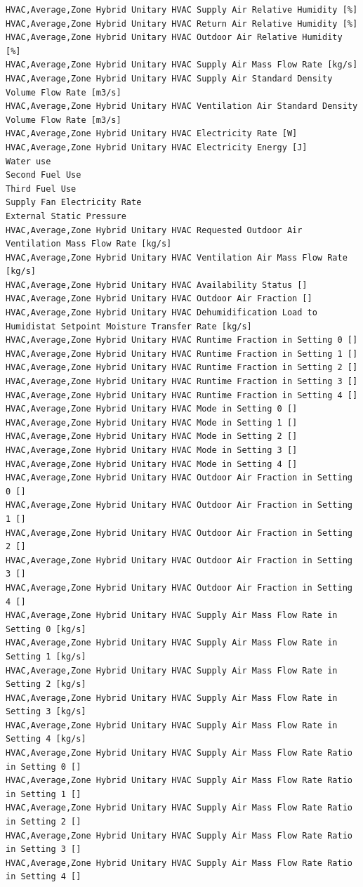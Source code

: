 {\begin{lstlisting}
HVAC,Average,Zone Hybrid Unitary HVAC Supply Air Relative Humidity [%]
HVAC,Average,Zone Hybrid Unitary HVAC Return Air Relative Humidity [%]
HVAC,Average,Zone Hybrid Unitary HVAC Outdoor Air Relative Humidity [%]
HVAC,Average,Zone Hybrid Unitary HVAC Supply Air Mass Flow Rate [kg/s]
HVAC,Average,Zone Hybrid Unitary HVAC Supply Air Standard Density Volume Flow Rate [m3/s]
HVAC,Average,Zone Hybrid Unitary HVAC Ventilation Air Standard Density Volume Flow Rate [m3/s]
HVAC,Average,Zone Hybrid Unitary HVAC Electricity Rate [W]
HVAC,Average,Zone Hybrid Unitary HVAC Electricity Energy [J]
Water use
Second Fuel Use
Third Fuel Use
Supply Fan Electricity Rate
External Static Pressure
HVAC,Average,Zone Hybrid Unitary HVAC Requested Outdoor Air Ventilation Mass Flow Rate [kg/s]
HVAC,Average,Zone Hybrid Unitary HVAC Ventilation Air Mass Flow Rate [kg/s]
HVAC,Average,Zone Hybrid Unitary HVAC Availability Status []
HVAC,Average,Zone Hybrid Unitary HVAC Outdoor Air Fraction []
HVAC,Average,Zone Hybrid Unitary HVAC Dehumidification Load to Humidistat Setpoint Moisture Transfer Rate [kg/s]
HVAC,Average,Zone Hybrid Unitary HVAC Runtime Fraction in Setting 0 []
HVAC,Average,Zone Hybrid Unitary HVAC Runtime Fraction in Setting 1 []
HVAC,Average,Zone Hybrid Unitary HVAC Runtime Fraction in Setting 2 []
HVAC,Average,Zone Hybrid Unitary HVAC Runtime Fraction in Setting 3 []
HVAC,Average,Zone Hybrid Unitary HVAC Runtime Fraction in Setting 4 []
HVAC,Average,Zone Hybrid Unitary HVAC Mode in Setting 0 []
HVAC,Average,Zone Hybrid Unitary HVAC Mode in Setting 1 []
HVAC,Average,Zone Hybrid Unitary HVAC Mode in Setting 2 []
HVAC,Average,Zone Hybrid Unitary HVAC Mode in Setting 3 []
HVAC,Average,Zone Hybrid Unitary HVAC Mode in Setting 4 []
HVAC,Average,Zone Hybrid Unitary HVAC Outdoor Air Fraction in Setting 0 []
HVAC,Average,Zone Hybrid Unitary HVAC Outdoor Air Fraction in Setting 1 []
HVAC,Average,Zone Hybrid Unitary HVAC Outdoor Air Fraction in Setting 2 []
HVAC,Average,Zone Hybrid Unitary HVAC Outdoor Air Fraction in Setting 3 []
HVAC,Average,Zone Hybrid Unitary HVAC Outdoor Air Fraction in Setting 4 []
HVAC,Average,Zone Hybrid Unitary HVAC Supply Air Mass Flow Rate in Setting 0 [kg/s]
HVAC,Average,Zone Hybrid Unitary HVAC Supply Air Mass Flow Rate in Setting 1 [kg/s]
HVAC,Average,Zone Hybrid Unitary HVAC Supply Air Mass Flow Rate in Setting 2 [kg/s]
HVAC,Average,Zone Hybrid Unitary HVAC Supply Air Mass Flow Rate in Setting 3 [kg/s]
HVAC,Average,Zone Hybrid Unitary HVAC Supply Air Mass Flow Rate in Setting 4 [kg/s]
HVAC,Average,Zone Hybrid Unitary HVAC Supply Air Mass Flow Rate Ratio in Setting 0 []
HVAC,Average,Zone Hybrid Unitary HVAC Supply Air Mass Flow Rate Ratio in Setting 1 []
HVAC,Average,Zone Hybrid Unitary HVAC Supply Air Mass Flow Rate Ratio in Setting 2 []
HVAC,Average,Zone Hybrid Unitary HVAC Supply Air Mass Flow Rate Ratio in Setting 3 []
HVAC,Average,Zone Hybrid Unitary HVAC Supply Air Mass Flow Rate Ratio in Setting 4 []
\end{lstlisting}
}

